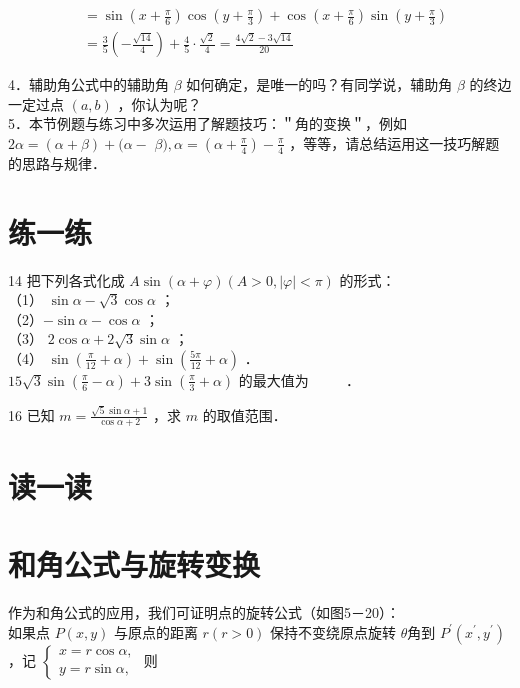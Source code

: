 \documentclass[10pt]{article}
\begin{document}
\[
\begin{aligned}
& =\sin \left(x+\frac{\pi}{6}\right) \cos \left(y+\frac{\pi}{3}\right)+\cos \left(x+\frac{\pi}{6}\right) \sin \left(y+\frac{\pi}{3}\right) \\
& =\frac{3}{5}\left(-\frac{\sqrt{14}}{4}\right)+\frac{4}{5} \cdot \frac{\sqrt{2}}{4}=\frac{4 \sqrt{2}-3 \sqrt{14}}{20}
\end{aligned}
\]

4．辅助角公式中的辅助角 \(\beta\) 如何确定，是唯一的吗？有同学说，辅助角 \(\beta\) 的终边一定过点 \((a, b)\) ，你认为呢？\\
5．本节例题与练习中多次运用了解题技巧：＂角的变换＂，例如 \(2 \alpha=(\alpha+\beta)+(\alpha-\) \(\beta), \alpha=\left(\alpha+\frac{\pi}{4}\right)-\frac{\pi}{4}\) ，等等，请总结运用这一技巧解题的思路与规律．

\section*{练一练}
14 把下列各式化成 \(A \sin (\alpha+\varphi)(A>0,|\varphi|<\pi)\) 的形式：\\
（1） \(\sin \alpha-\sqrt{3} \cos \alpha\) ；\\
（2）\(-\sin \alpha-\cos \alpha\) ；\\
（3） \(2 \cos \alpha+2 \sqrt{3} \sin \alpha\) ；\\
（4） \(\sin \left(\frac{\pi}{12}+\alpha\right)+\sin \left(\frac{5 \pi}{12}+\alpha\right)\) ．\\
\(15 \sqrt{3} \sin \left(\frac{\pi}{6}-\alpha\right)+3 \sin \left(\frac{\pi}{3}+\alpha\right)\) 的最大值为 \(\qquad\) ．

16 已知 \(m=\frac{\sqrt{5} \sin \alpha+1}{\cos \alpha+2}\) ，求 \(m\) 的取值范围．

\section*{读一读}
\section*{和角公式与旋转变换}
作为和角公式的应用，我们可证明点的旋转公式（如图5－20）：\\
如果点 \(P(x, y)\) 与原点的距离 \(r(r>0)\) 保持不变绕原点旋转 \(\theta\)角到 \(P^{\prime}\left(x^{\prime}, y^{\prime}\right)\) ，记 \(\left\{\begin{array}{l}x=r \cos \alpha, \\ y=r \sin \alpha,\end{array}\right.\) 则
\end{document}
